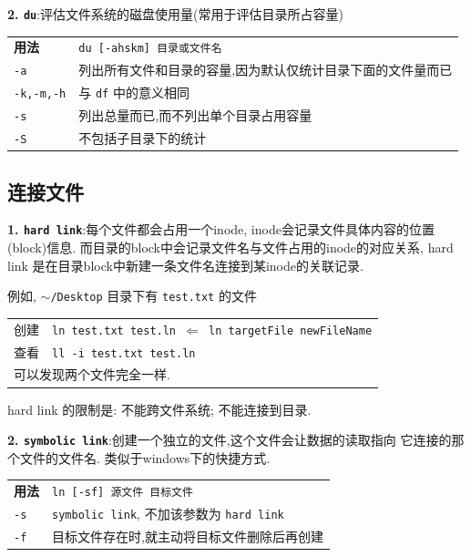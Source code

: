 \par
\textbf{2. \texttt{du}}:评估文件系统的磁盘使用量(常用于评估目录所占容量)
{\kaishu
\begin{longtable}{l@{ : }p{}}\hline\hline

    \textbf{用法} & \verb"du [-ahskm] 目录或文件名"
    \\

    \texttt{-a} & 列出所有文件和目录的容量,因为默认仅统计目录下面的文件量而已\\

     \texttt{-k,-m,-h}  & 与 \texttt{df} 中的意义相同 \\

    \texttt{-s} & 列出总量而已,而不列出单个目录占用容量\\

    \texttt{-S} & 不包括子目录下的统计\\

    \hline
\end{longtable}}


\subsection{连接文件}
\par
\textbf{1. \texttt{hard link}}:每个文件都会占用一个inode, inode会记录文件具体内容的位置(block)信息. 而目录的block中会记录文件名与文件占用的inode的对应关系, hard link 是在目录block中新建一条文件名连接到某inode的关联记录.
\par
例如, \texttt{$\sim$/Desktop} 目录下有 \texttt{test.txt} 的文件
{\kaishu
\begin{longtable}{l@{ : }p{}}\hline\hline
创建 & \texttt{ln test.txt test.ln  $\Leftarrow$ ln targetFile newFileName}\\

查看 & \texttt{ll -i test.txt test.ln}\\

\multicolumn{2}{l}{可以发现两个文件完全一样.}\\
\hline
\end{longtable}}
hard link 的限制是: 不能跨文件系统; 不能连接到目录.

\par
\textbf{2. \texttt{symbolic link}}:创建一个独立的文件,这个文件会让数据的读取指向%
它连接的那个文件的文件名. 类似于windows下的快捷方式.
{\kaishu
\begin{longtable}{l@{ : }p{}}\hline\hline
\textbf{用法} & \verb"ln [-sf] 源文件 目标文件"
    \\

    \texttt{-s} & \texttt{symbolic link}, 不加该参数为 \texttt{hard link}\\

    \texttt{-f} & 目标文件存在时,就主动将目标文件删除后再创建\\
\hline
\end{longtable}}

